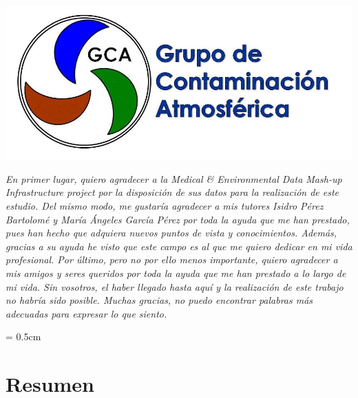 \documentclass[12pt]{article}
\begin{document}
\begin{minipage}[]{20cm}
\hspace{8.7cm}
\includegraphics[scale=0.4]{logotipo-3-3}
\vspace{7cm}
\end{minipage}


\begin{flushright}
\normalsize \textit{En primer lugar, quiero agradecer a la Medical \& Environmental Data Mash-up Infrastructure project por la disposición de sus datos para la realización de este estudio. Del mismo modo, me gustaría agradecer a mis tutores Isidro Pérez Bartolomé y María Ángeles García Pérez por toda la ayuda que me han prestado, pues han hecho que adquiera nuevos puntos de vista y conocimientos. Además, gracias a su ayuda he visto que este campo es al que me quiero dedicar en mi vida profesional. Por último, pero no por ello menos importante, quiero agradecer a mis amigos y seres queridos por toda la ayuda que me han prestado a lo largo de mi vida. Sin vosotros, el haber llegado hasta aquí y la realización de este trabajo no habría sido posible. Muchas gracias, no puedo encontrar palabras más adecuadas para expresar lo que siento.}
\end{flushright}

\newpage

\begin{minipage}[]{20cm}
\vspace{10cm}
\end{minipage}

\newpage

\parskip = 0.5cm
\newpage
\tableofcontents
\newpage
{}	%
\setcounter{page}{1}


\section*{Resumen}
%
\end{document}
